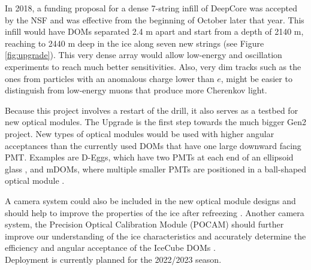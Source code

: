 In 2018, a funding proposal for a dense 7-string infill of DeepCore was accepted by the NSF and was effective from the beginning of October later that year. This infill would have DOMs separated 2.4 m apart and start from a depth of 2140 m, reaching to 2440 m deep in the ice along seven new strings (see Figure \ref{fig:upgrade}). This very dense array would allow low-energy and oscillation experiments to reach much better sensitivities. Also, very dim tracks such as the ones from particles with an anomalous charge lower than $e$, might be easier to distinguish from low-energy muons that produce more Cherenkov light. 

Because this project involves a restart of the drill, it also serves as a testbed for new optical modules. The Upgrade is the first step towards the much bigger Gen2 project. New types of optical modules would be used with higher angular acceptances than the currently used DOMs that have one large downward facing PMT. Examples are D-Eggs, which have two PMTs at each end of an ellipsoid glass \cite{Ishihara:2017vxn}, and mDOMs, where multiple smaller PMTs are positioned in a ball-shaped optical module \cite{Classen:2017sng}. 

A camera system could also be included in the new optical module designs and should help to improve the properties of the ice after refreezing \cite{Collaboration:2017chl}. Another camera system, the Precision Optical Calibration Module (POCAM) should further improve our understanding of the ice characteristics and accurately determine the efficiency and angular acceptance of the IceCube DOMs \cite{Resconi:2017mad}.\\
\newline
Deployment is currently planned for the 2022/2023 season.

